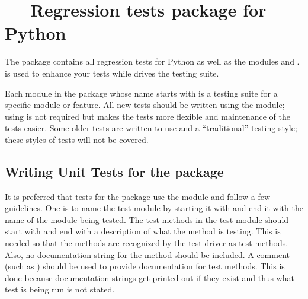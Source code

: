 \section{ ---
         Regression tests package for Python}



The  package contains all regression tests for Python as
well as the modules  and
.   is used to enhance
your tests while  drives the testing suite.

Each module in the  package whose name starts with
 is a testing suite for a specific module or feature.
All new tests should be written using the  module;
using  is not required but makes the tests more
flexible and maintenance of the tests easier.  Some older tests are
written to use  and a ``traditional'' testing
style; these styles of tests will not be covered.

\begin{seealso}
\end{seealso}


\subsection{Writing Unit Tests for the  package%
            \label{writing-tests}}

It is preferred that tests for the  package use the
 module and follow a few guidelines.
One is to name the test module by starting it with  and end it with
the name of the module being tested.
The test methods in the test module should start with  and end with
a description of what the method is testing.
This is needed so that the methods are recognized by the test driver as
test methods.
Also, no documentation string for the method should be included.
A comment (such as
) should be used to provide
documentation for test methods.
This is done because documentation strings get printed out if they exist and
thus what test is being run is not stated.

